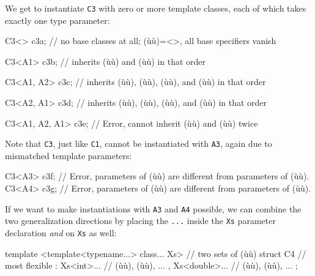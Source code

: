 \noindent We get to instantiate \lstinline!C3! with zero or more template classes,
each of which takes exactly one type parameter:

\begin{emcppslisting}[emcppsbatch=e24]
C3<>           c3a;
    // no base classes at all; (ù{}ù)=<>, all base specifiers vanish

C3<A1>         c3b;
    // inherits (ù{}ù) and (ù{}ù) in that order

C3<A1, A2>     c3c;
    // inherits (ù{}ù), (ù{}ù), (ù{}ù), and (ù{}ù) in that order

C3<A2, A1>     c3d;
    // inherits (ù{}ù), (ù{}ù), (ù{}ù), and (ù{}ù) in that order

C3<A1, A2, A1> c3e;
    // Error, cannot inherit (ù{}ù) and (ù{}ù) twice
\end{emcppslisting}
    

\noindent Note that \lstinline!C3!, just like \lstinline!C1!, cannot be instantiated
with \lstinline!A3!, again due to mismatched template parameters:

\begin{emcppslisting}[emcppsbatch=e24]
C3<A3> c3f;
    // Error, parameters of (ù{}ù) are different from parameters of (ù{}ù).
C3<A4> c3g;
    // Error, parameters of (ù{}ù) are different from parameters of (ù{}ù).
\end{emcppslisting}
    

\noindent If we want to make instantiations with \lstinline!A3! and \lstinline!A4!
possible, we can combine the two generalization directions by placing
the \lstinline!...! inside the \lstinline!Xs! parameter declaration \emph{and}
on \lstinline!Xs! as well:

\begin{emcppslisting}[emcppsbatch=e24]
template <template<typename...> class... Xs>  // two sets of (ù{}ù)
struct C4                                     // most flexible
    : Xs<int>...                              // (ù{}ù), (ù{}ù), ...
    , Xs<double>...                           // (ù{}ù), (ù{}ù), ...
{ };
\end{emcppslisting}
    

